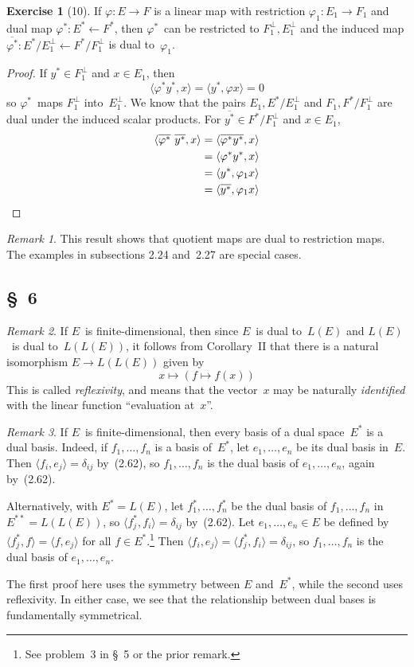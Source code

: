 \documentclass[letterpaper,12pt]{article}
\newcommand{\from}{\leftarrow}
\newcommand{\sprod}[2]{\langle#1,#2\rangle}
\newcommand{\oc}[1]{#1^{\perp}}
\newcommand{\proj}[1]{\overline{#1}}
\theoremstyle{definition}
\newtheorem*{exer}{Exercise}
\theoremstyle{remark}
\newtheorem*{rmk}{Remark}
\begin{document}
\begin{exer}[10]
If \(\varphi:E\to F\) is a linear map with restriction \(\varphi_1:E_1\to F_1\) and dual map \(\varphi^*:E^*\from F^*\), then \(\varphi^*\)~can be restricted to \(\oc{F_1},\oc{E_1}\) and the induced map \(\proj{\varphi^*}:E^*/\oc{E_1}\from F^*/\oc{F_1}\) is dual to~\(\varphi_1\).
\end{exer}
\begin{proof}
If \(y^*\in\oc{F_1}\) and \(x\in E_1\), then
\[\sprod{\varphi^*y^*}{x}=\sprod{y^*}{\varphi x}=0\]
so \(\varphi^*\)~maps \(\oc{F_1}\) into~\(\oc{E_1}\). We know that the pairs \(E_1,E^*/\oc{E_1}\) and \(F_1,F^*/\oc{F_1}\) are dual under the induced scalar products. For \(\proj{y^*}\in F^*/\oc{F_1}\) and \(x\in E_1\),
\begin{align*}
\sprod{\proj{\varphi^*}\ \proj{y^*}}{x}&=\sprod{\proj{\varphi^* y^*}}{x}\\
	&=\sprod{\varphi^* y^*}{x}\\
	&=\sprod{y^*}{\varphi_1 x}\\
	&=\sprod{\proj{y^*}}{\varphi_1 x}\qedhere
\end{align*}
\end{proof}
\begin{rmk}
This result shows that quotient maps are dual to restriction maps. The examples in subsections 2.24 and~2.27 are special cases.
\end{rmk}

\subsection*{\S~6}
\begin{rmk}
If \(E\)~is finite-dimensional, then since \(E\)~is dual to~\(L(E)\) and \(L(E)\)~is dual to~\(L(L(E))\), it follows from Corollary~II that there is a natural isomorphism \(E\to L(L(E))\) given by
\[x\mapsto(f\mapsto f(x))\]
This is called \emph{reflexivity}, and means that the vector~\(x\) may be naturally \emph{identified} with the linear function ``evaluation at~\(x\)''.
\end{rmk}

\begin{rmk}
If \(E\)~is finite-dimensional, then every basis of a dual space~\(E^*\) is a dual basis. Indeed, if \(f_1,\ldots,f_n\) is a basis of~\(E^*\), let \(e_1,\ldots,e_n\) be its dual basis in~\(E\). Then \(\sprod{f_i}{e_j}=\delta_{ij}\) by~(2.62), so \(f_1,\ldots,f_n\) is the dual basis of \(e_1,\ldots,e_n\), again by~(2.62).

Alternatively, with \(E^*=L(E)\), let \(f_1^*,\ldots,f_n^*\) be the dual basis of \(f_1,\ldots,f_n\) in \(E^{**}=L(L(E))\), so \(\sprod{f_j^*}{f_i}=\delta_{ij}\) by~(2.62). Let \(e_1,\ldots,e_n\in E\) be defined by \(\sprod{f_j^*}{f}=\sprod{f}{e_j}\) for all \(f\in E^*\).\footnote{See problem~3 in \S~5 or the prior remark.} Then \(\sprod{f_i}{e_j}=\sprod{f_j^*}{f_i}=\delta_{ij}\), so \(f_1,\ldots,f_n\) is the dual basis of \(e_1,\ldots,e_n\).

The first proof here uses the symmetry between \(E\) and~\(E^*\), while the second uses reflexivity. In either case, we see that the relationship between dual bases is fundamentally symmetrical.
\end{rmk}
\end{document}
